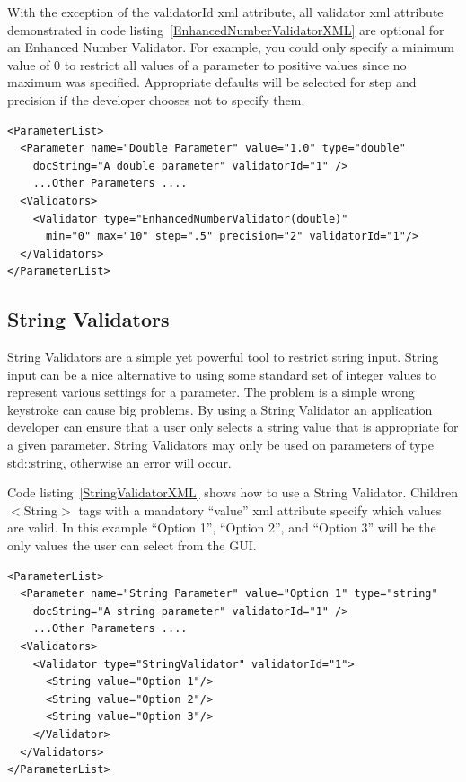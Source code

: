 With the exception of the validatorId xml attribute, all validator xml attribute demonstrated in code listing~\ref{EnhancedNumberValidatorXML}
are optional for an Enhanced Number Validator. For example, you could only specify a minimum value of 0 to restrict all 
values of a parameter to positive values since no maximum was specified.
Appropriate defaults will be selected for step and precision if the developer chooses not to specify them.
\begin{lstlisting}[caption={Example usage of an Enhanced Number Validator}, label=EnhancedNumberValidatorXML]
<ParameterList>
  <Parameter name="Double Parameter" value="1.0" type="double" 
    docString="A double parameter" validatorId="1" />
    ...Other Parameters ....
  <Validators>
    <Validator type="EnhancedNumberValidator(double)" 
      min="0" max="10" step=".5" precision="2" validatorId="1"/>
  </Validators>
</ParameterList>
\end{lstlisting}

\subsection{String Validators}
String Validators are a simple yet powerful tool to restrict string input. String input can be a nice alternative to
using some standard set of integer values to represent various settings for a parameter. The problem is a simple wrong 
keystroke can cause big problems. By using a String Validator an application developer can ensure that a user 
only selects a string value that is appropriate for a given parameter. 
String Validators may only be used on parameters of type std::string, otherwise an error will occur.

Code listing~\ref{StringValidatorXML} shows how to use a String Validator. Children $<$String$>$ tags with a mandatory ``value'' xml attribute specify which values are 
valid.  In this example ``Option 1'', ``Option 2'', and ``Option 3'' will be the only values the user can select from the GUI.
\begin{lstlisting}[caption={Example usage of a String Validator}, label=StringValidatorXML]
<ParameterList>
  <Parameter name="String Parameter" value="Option 1" type="string" 
    docString="A string parameter" validatorId="1" />
    ...Other Parameters ....
  <Validators>
    <Validator type="StringValidator" validatorId="1">
      <String value="Option 1"/> 
      <String value="Option 2"/> 
      <String value="Option 3"/> 
    </Validator>
  </Validators>
</ParameterList>
\end{lstlisting}

